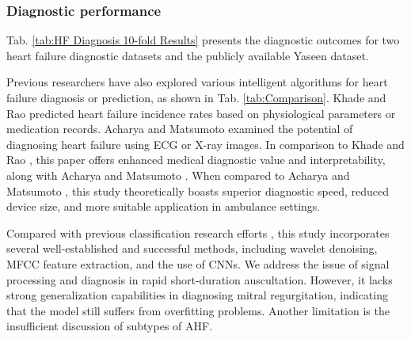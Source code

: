 \subsubsection{Diagnostic performance}
Tab. \ref{tab:HF Diagnosis 10-fold Results} presents the diagnostic outcomes for two heart failure diagnostic datasets and the publicly available Yaseen dataset.

Previous researchers have also explored various intelligent algorithms for heart failure diagnosis or prediction, as shown in Tab. \ref{tab:Comparison}. Khade \cite{khade2019system} and Rao \cite{rao2022explainable} predicted heart failure incidence rates based on physiological parameters or medication records. Acharya \cite{acharya2019deep} and Matsumoto \cite{matsumoto2020diagnosing} examined the potential of diagnosing heart failure using ECG or X-ray images. In comparison to Khade \cite{khade2019system} and Rao \cite{rao2022explainable}, this paper offers enhanced medical diagnostic value and interpretability, along with Acharya \cite{acharya2019deep} and Matsumoto \cite{matsumoto2020diagnosing}. When compared to Acharya \cite{acharya2019deep} and Matsumoto \cite{matsumoto2020diagnosing}, this study theoretically boasts superior diagnostic speed, reduced device size, and more suitable application in ambulance settings.

Compared with previous classification research efforts \cite{vepa2009classification, wu2010hidden, rubin2016classifying, arora2021transfer, li2021lightweight, shuvo2021cardioxnet}, this study incorporates several well-established and successful methods, including wavelet denoising, MFCC feature extraction, and the use of CNNs. We address the issue of signal processing and diagnosis in rapid short-duration auscultation. However, it lacks strong generalization capabilities in diagnosing mitral regurgitation, indicating that the model still suffers from overfitting problems. 
Another limitation is the insufficient discussion of subtypes of AHF.

